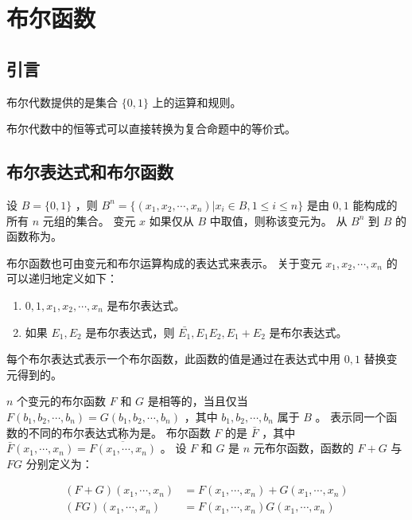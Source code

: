 
\section{布尔函数}
{
    \subsection{引言}
    {
        布尔代数提供的是集合 $\{0, 1\}$ 上的运算和规则。

        布尔代数中的恒等式可以直接转换为复合命题中的等价式。
    }

    \subsection{布尔表达式和布尔函数}
    {
        设 $B = \{0, 1\}$ ，则 $B^n = \{(x_1, x_2, \cdots, x_n) | x_i \in B, 1 \leq i \leq n\}$ 是由 $0, 1$ 能构成的所有 $n$ 元组的集合。
        变元 $x$ 如果仅从 $B$ 中取值，则称该变元为。
        从 $B^n$ 到 $B$ 的函数称为。

        布尔函数也可由变元和布尔运算构成的表达式来表示。
        关于变元 $x_1, x_2, \cdots, x_n$ 的可以递归地定义如下：

        \begin{enumerate}
            \item $0, 1, x_1, x_2, \cdots, x_n$ 是布尔表达式。
            \item 如果 $E_1, E_2$ 是布尔表达式，则 $\bar{E_1}, E_1E_2, E_1 + E_2$ 是布尔表达式。
        \end{enumerate}

        每个布尔表达式表示一个布尔函数，此函数的值是通过在表达式中用 $0, 1$ 替换变元得到的。

        $n$ 个变元的布尔函数 $F$ 和 $G$ 是相等的，当且仅当 $F(b_1, b_2, \cdots, b_n) = G(b_1, b_2, \cdots, b_n)$ ，其中 $b_1, b_2, \cdots, b_n$ 属于 $B$ 。
        表示同一个函数的不同的布尔表达式称为是。
        布尔函数 $F$ 的是 $\bar{F}$ ，其中 $\bar{F}(x_1, \cdots, x_n) = \overline{F(x_1, \cdots, x_n)}$ 。
        设 $F$ 和 $G$ 是 $n$ 元布尔函数，函数的 $F + G$ 与 $FG$ 分别定义为：
        
        \begin{align*}
            (F + G)(x_1, \cdots, x_n) &= F(x_1, \cdots, x_n) + G(x_1, \cdots, x_n) \\
            (FG)(x_1, \cdots, x_n) &= F(x_1, \cdots, x_n)G(x_1, \cdots, x_n)
        \end{align*}

}}
